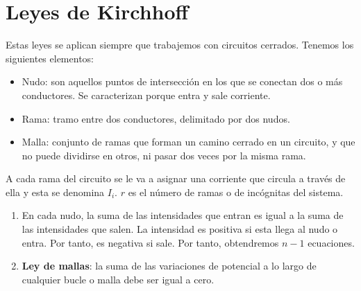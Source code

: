 \documentclass{./FisicaII.tex}
\begin{document}
\section{Leyes de Kirchhoff}
Estas leyes se aplican siempre que trabajemos con circuitos cerrados.
Tenemos los siguientes elementos:
\begin{itemize}
	\item Nudo: son aquellos puntos de intersección en los que se conectan dos o más conductores. Se caracterizan porque entra y sale corriente.
	\item Rama: tramo entre dos conductores, delimitado por dos nudos.
	\item Malla: conjunto de ramas que forman un camino cerrado en un circuito, y que no puede dividirse en otros, ni pasar dos veces por la misma rama.
\end{itemize}
A cada rama del circuito se le va a asignar una corriente que circula a través de ella y esta se denomina $I_{i}$. $r$ es el número de ramas o de incógnitas del sistema. 
\begin{enumerate}
	\item En cada nudo, la suma de las intensidades que entran es igual a la suma de las intensidades que salen. La intensidad es positiva si esta llega al nudo o entra. Por tanto, es negativa si sale. Por tanto, obtendremos $n-1$ ecuaciones. 
	\item \textbf{Ley de mallas}: la suma de las variaciones de potencial a lo largo de cualquier bucle o malla debe ser igual a cero.
\end{enumerate}
\end{document}
